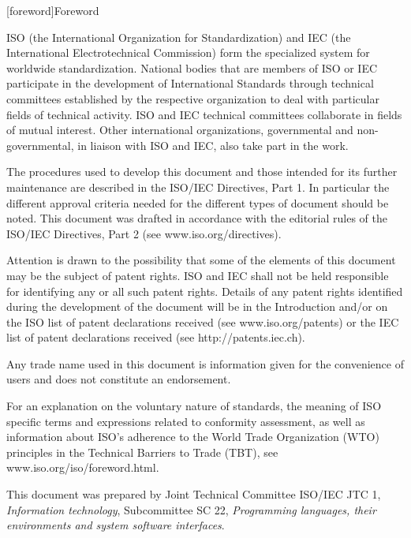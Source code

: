 
[foreword]{Foreword}

ISO (the International Organization for Standardization) and IEC (the International Electrotechnical Commission) form the specialized system for worldwide standardization. National bodies that are members of ISO or IEC participate in the development of International Standards through technical committees established by the respective organization to deal with particular fields of technical activity. ISO and IEC technical committees collaborate in fields of mutual interest. Other international organizations, governmental and non-governmental, in liaison with ISO and IEC, also take part in the work.

The procedures used to develop this document and those intended for its further maintenance are described in the ISO/IEC Directives, Part 1. In particular the different approval criteria needed for the different types of document should be noted. This document was drafted in accordance with the editorial rules of the ISO/IEC Directives, Part 2 (see www.iso.org/directives).

Attention is drawn to the possibility that some of the elements of this document may be the subject of patent rights. ISO and IEC shall not be held responsible for identifying any or all such patent rights. Details of any patent rights identified during the development of the document will be in the Introduction and/or on the ISO list of patent declarations received (see www.iso.org/patents) or the IEC list of patent declarations received (see http://patents.iec.ch).

Any trade name used in this document is information given for the convenience of users and does not constitute an endorsement.

For an explanation on the voluntary nature of standards, the meaning of ISO specific terms and expressions related to conformity assessment, as well as information about ISO’s adherence to the World Trade Organization (WTO) principles in the Technical Barriers to Trade (TBT), see www.iso.org/iso/foreword.html.

This document was prepared by Joint Technical Committee ISO/IEC JTC 1, \textit{Information technology}, Subcommittee SC 22, \textit{Programming languages, their environments and system software interfaces}.

